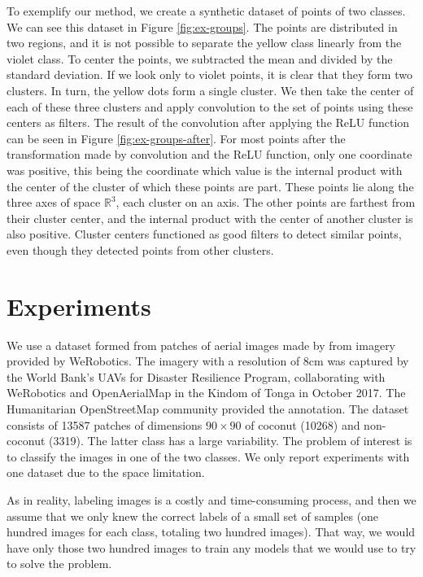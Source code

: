 \documentclass[a4paper,conference]{IEEEtran}
\begin{document}
To exemplify our method, we create a synthetic dataset of points of two classes. We can see this dataset in Figure \ref{fig:ex-groups}. The points are distributed in two regions, and it is not possible to separate the yellow class linearly from the violet class. To center the points,  we subtracted the mean and divided by the standard deviation. If we look only to violet points, it is clear that they form two clusters. In turn, the yellow dots form a single cluster. We then take the center of each of these three clusters and apply convolution to the set of points using these centers as filters. The result of the convolution after applying the ReLU function can be seen in Figure \ref{fig:ex-groups-after}. For most points after the transformation made by convolution and the ReLU function, only one coordinate was positive, this being the coordinate which value is the internal product with the center of the cluster of which these points are part. These points lie along the three axes of space $\mathbb{R}^3$, each cluster on an axis. The other points are farthest from their cluster center, and the internal product with the center of another cluster is also positive. Cluster centers functioned as good filters to detect similar points, even though they detected points from other clusters.

\section{Experiments}
We use a dataset formed from patches of aerial images made by \cite{8899005} from imagery provided by WeRobotics. The imagery with a resolution of 8cm was captured by the World Bank's UAVs for Disaster Resilience Program, collaborating with WeRobotics and OpenAerialMap in the Kindom of Tonga in October 2017. The Humanitarian OpenStreetMap community provided the annotation. The dataset consists of 13587 patches of dimensions $90 \times 90$ of coconut (10268) and non-coconut (3319). The latter class has a large variability. The problem of interest is to classify the images in one of the two classes. We only report experiments with one dataset due to the space limitation.

As in reality, labeling images is a costly and time-consuming process, and then we assume that we only knew the correct labels of a small set of samples (one hundred images for each class, totaling two hundred images). That way, we would have only those two hundred images to train any models that we would use to try to solve the problem.
\end{document}
